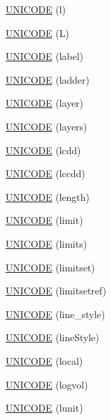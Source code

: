 \begin{DoxyCompactItemize}
\item 
\hyperlink{namespace_d_d4hep_1_1_x_m_l_ad1a73fe9d363f73e07b502ec2efe04e9}{U\+N\+I\+C\+O\+DE} (l)
\item 
\hyperlink{namespace_d_d4hep_1_1_x_m_l_aebd5986b62f4201f4f94143f57ebcf38}{U\+N\+I\+C\+O\+DE} (L)
\item 
\hyperlink{namespace_d_d4hep_1_1_x_m_l_a8b60a6f01d8155d38b8a1e5dea6899ca}{U\+N\+I\+C\+O\+DE} (label)
\item 
\hyperlink{namespace_d_d4hep_1_1_x_m_l_a780737736a46409cc21d50c5c11c219d}{U\+N\+I\+C\+O\+DE} (ladder)
\item 
\hyperlink{namespace_d_d4hep_1_1_x_m_l_a56c96e0ff661753570981fe07b3a4c88}{U\+N\+I\+C\+O\+DE} (layer)
\item 
\hyperlink{namespace_d_d4hep_1_1_x_m_l_aa0496d4114e8a8f4c50ccf0f7c812b52}{U\+N\+I\+C\+O\+DE} (layers)
\item 
\hyperlink{namespace_d_d4hep_1_1_x_m_l_a328e84fa3cc37e9dda09dea109e5692c}{U\+N\+I\+C\+O\+DE} (lcdd)
\item 
\hyperlink{namespace_d_d4hep_1_1_x_m_l_a3f5fb99aac45758cd31845bee59ae087}{U\+N\+I\+C\+O\+DE} (lccdd)
\item 
\hyperlink{namespace_d_d4hep_1_1_x_m_l_a09edfa735264b49205a628afadf0af82}{U\+N\+I\+C\+O\+DE} (length)
\item 
\hyperlink{namespace_d_d4hep_1_1_x_m_l_a72de6a6830106f8a0ab83bdb46be68a3}{U\+N\+I\+C\+O\+DE} (limit)
\item 
\hyperlink{namespace_d_d4hep_1_1_x_m_l_a742a3cc0c88de0fa62885e5d932211c5}{U\+N\+I\+C\+O\+DE} (limits)
\item 
\hyperlink{namespace_d_d4hep_1_1_x_m_l_ad91efab2e5432fea9347d7e54e716d4b}{U\+N\+I\+C\+O\+DE} (limitset)
\item 
\hyperlink{namespace_d_d4hep_1_1_x_m_l_a906973f56218ef383186c13e77faaa13}{U\+N\+I\+C\+O\+DE} (limitsetref)
\item 
\hyperlink{namespace_d_d4hep_1_1_x_m_l_a32753339e1cbde9854bcfb845e8ed848}{U\+N\+I\+C\+O\+DE} (line\+\_\+style)
\item 
\hyperlink{namespace_d_d4hep_1_1_x_m_l_a36f75e7bc006577fd1ea6ae47513dbef}{U\+N\+I\+C\+O\+DE} (line\+Style)
\item 
\hyperlink{namespace_d_d4hep_1_1_x_m_l_a5c67b47b6c902e66481f508fd64fbc72}{U\+N\+I\+C\+O\+DE} (local)
\item 
\hyperlink{namespace_d_d4hep_1_1_x_m_l_a06296210df0a27ee6158ff1c347231d9}{U\+N\+I\+C\+O\+DE} (logvol)
\item 
\hyperlink{namespace_d_d4hep_1_1_x_m_l_aef4bcbeba11c77315e897b3190c50738}{U\+N\+I\+C\+O\+DE} (lunit)

\end{DoxyCompactItemize}

